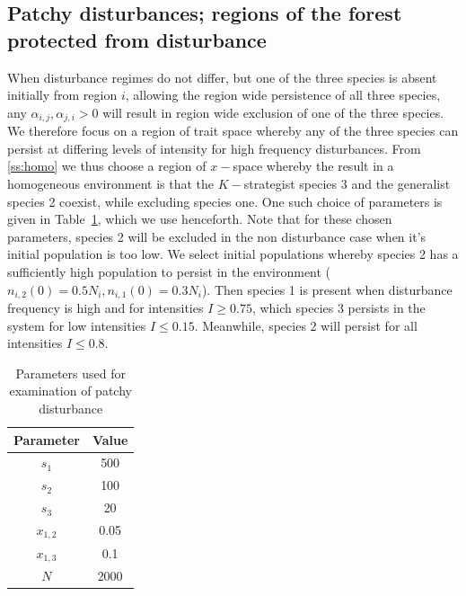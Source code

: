 \documentclass[preprint,10pt,reqno]{amsart}
\begin{document}
\subsection{Patchy disturbances; regions of the forest protected from disturbance}
When disturbance regimes do not differ, but one of the three species is absent initially from region $i$, allowing the region wide persistence of all three species, any $\alpha_{i,j},\alpha_{j,i}>0$ will result in region wide exclusion of one of the three species. We therefore focus on a region of trait space whereby any of the three species can persist at differing levels of intensity for high frequency disturbances. From \ref{ss:homo} we thus choose a region of $x-$space whereby the result in a homogeneous environment is that the $K-$strategist species 3 and the generalist species 2 coexist, while excluding species one. One such choice of parameters is given in Table~\ref{tab:paras}, which we use henceforth. Note that for these chosen parameters, species 2 will be excluded in the non disturbance case when it's initial population is too low. We select initial populations whereby species 2 has a sufficiently high population to persist in the environment ($n_{i,2}(0)=0.5N_i,n_{i,1}(0)=0.3N_i$). Then species 1 is present when disturbance frequency is high and for intensities $I\geq0.75$, which species 3 persists in the system for low intensities $I\leq 0.15$. Meanwhile, species 2 will persist for all intensities $I\leq 0.8$.
\begin{table}[htdp]
\begin{center}
\begin{tabular}{|c|c|} \hline
Parameter & Value\\ \hline
$s_1$&500\\
$s_2$&100\\
$s_3$&20\\
$x_{1,2}$&0.05\\
$x_{1,3}$&0.1\\
$N$&2000\\ \hline
\end{tabular}
\end{center}
\caption{Parameters used for examination of patchy disturbance}
\label{tab:paras}
\end{table}
\end{document}
